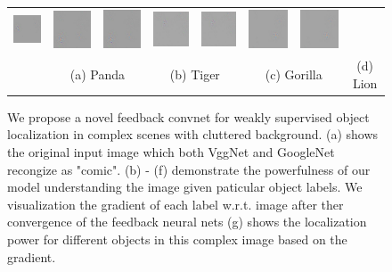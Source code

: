 \begin{figure}
\begin{center}
\begin{tabular}{ccccccccc}
\includegraphics[width=0.11\linewidth]{figs/visual_compare/saliency/feedback/panda} &
\includegraphics[width=0.11\linewidth]{figs/visual_compare/gradient/feedback/tiger} &
\includegraphics[width=0.11\linewidth]{figs/visual_compare/saliency/feedback/tiger} &
\includegraphics[width=0.11\linewidth]{figs/visual_compare/gradient/feedback/gorilla} &
\includegraphics[width=0.11\linewidth]{figs/visual_compare/saliency/feedback/gorilla} &
\includegraphics[width=0.11\linewidth]{figs/visual_compare/gradient/feedback/lion} &
\includegraphics[width=0.11\linewidth]{figs/visual_compare/saliency/feedback/lion} \\
&
\multicolumn{2}{c}{{\small (a) Panda}} &
\multicolumn{2}{c}{{\small (b) Tiger}} &
\multicolumn{2}{c}{{\small (c) Gorilla}} &
\multicolumn{2}{c}{{\small (d) Lion}} \\
\end{tabular}
\caption{We propose a novel feedback convnet for weakly supervised object localization in complex scenes with cluttered background. (a) shows the original input image which both VggNet and GoogleNet recongize as "comic". (b) - (f) demonstrate the powerfulness of our model understanding the image given paticular object labels. We visualization the gradient of each label w.r.t. image after ther convergence of the feedback neural nets (g) shows the localization power for different objects in this complex image based on the gradient.}
\label{fig:splash}
\end{center}
\end{figure}

